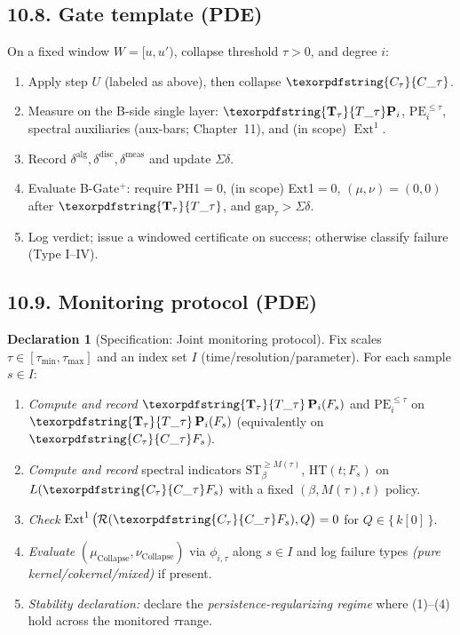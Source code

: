 \documentclass[11pt]{article}
\DeclareMathOperator{\Ext}{Ext}
\DeclareRobustCommand{\hyp}{\nobreakdash-}
\newcommand{\Rfun}{\mathcal{R}}
\numberwithin{equation}{section}
\theoremstyle{definition}
\newtheorem{declaration}[theorem]{Declaration}
\DeclareRobustCommand{\Ttau}{\texorpdfstring{\ensuremath{\mathbf{T}_{\tau}}}{T\_\tau}}
\DeclareRobustCommand{\Ctau}{\texorpdfstring{\ensuremath{C_{\tau}}}{C\_\tau}}
\DeclareRobustCommand{\muc}{\mu_{\mathrm{Collapse}}}
\DeclareRobustCommand{\nuc}{\nu_{\mathrm{Collapse}}}
\DeclareRobustCommand{\Qtest}{\{\,k[0]\,\}}
\begin{document}
\subsection*{10.8. Gate template (PDE)}
On a fixed window \(W=[u,u')\), collapse threshold \(\tau>0\), and degree \(i\):
\begin{enumerate}
  \item Apply step \(U\) (labeled as above), then collapse \(\Ctau\).
  \item Measure on the B\hyp side single layer: \(\Ttau\mathbf{P}_i\), \(\mathrm{PE}_i^{\le\tau}\), spectral auxiliaries (aux\hyp bars; Chapter~11), and (in scope) \(\Ext^1\).
  \item Record \(\delta^{\mathrm{alg}},\delta^{\mathrm{disc}},\delta^{\mathrm{meas}}\) and update \(\Sigma\delta\).
  \item Evaluate B\hyp Gate\(^{+}\): require PH1\(=0\), (in scope) Ext1\(=0\), \((\mu,\nu)=(0,0)\) after \(\Ttau\), and \(\mathrm{gap}_\tau>\Sigma\delta\).
  \item Log verdict; issue a windowed certificate on success; otherwise classify failure (Type I–IV).
\end{enumerate}

\subsection*{10.9. Monitoring protocol (PDE)}
\begin{declaration}[Specification: Joint monitoring protocol]\label{spec:10-protocol}
Fix scales \(\tau\in[\tau_{\min},\tau_{\max}]\) and an index set \(I\) (time/resolution/parameter).
For each sample \(s\in I\):
\begin{enumerate}
  \item \emph{Compute and record} \(\Ttau\,\mathbf{P}_i(F_s)\) and \(\mathrm{PE}_i^{\le \tau}\) on \(\Ttau\,\mathbf{P}_i(F_s)\) (equivalently on \(\Ctau F_s\)).
  \item \emph{Compute and record} spectral indicators \(\mathrm{ST}_\beta^{\ge M(\tau)}\), \(\mathrm{HT}(t;F_s)\) on \(L(\Ctau F_s)\) with a fixed \((\beta,M(\tau),t)\) policy.
  \item \emph{Check} \(\Ext^1\big(\Rfun(\Ctau F_s),Q\big)=0\) for \(Q\in\Qtest\).
  \item \emph{Evaluate} \((\muc,\nuc)\) via \(\phi_{i,\tau}\) along \(s\in I\) and log failure types \emph{(pure kernel/cokernel/mixed)} if present.
  \item \emph{Stability declaration:} declare the \emph{persistence\hyp regularizing regime} where (1)–(4) hold across the monitored \(\tau\)\nobreakdash range.
\end{enumerate}
\end{declaration}
\end{document}
